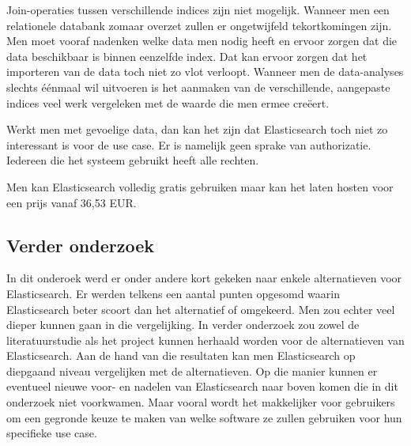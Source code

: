 Join-operaties tussen verschillende indices zijn niet mogelijk. Wanneer men een relationele databank zomaar overzet zullen er ongetwijfeld tekortkomingen zijn. Men moet vooraf nadenken welke data men nodig heeft en ervoor zorgen dat die data beschikbaar is binnen eenzelfde index. Dat kan ervoor zorgen dat het importeren van de data toch niet zo vlot verloopt. Wanneer men de data-analyses slechts éénmaal wil uitvoeren is het aanmaken van de verschillende, aangepaste indices veel werk vergeleken met de waarde die men ermee creëert.

Werkt men met gevoelige data, dan kan het zijn dat Elasticsearch toch niet zo interessant is voor de use case. Er is namelijk geen sprake van authorizatie. Iedereen die het systeem gebruikt heeft alle rechten.

Men kan Elasticsearch volledig gratis gebruiken maar kan het laten hosten voor een prijs vanaf 36,53 EUR.

\subsection{Verder onderzoek}
In dit onderoek werd er onder andere kort gekeken naar enkele alternatieven voor Elasticsearch. Er werden telkens een aantal punten opgesomd waarin Elasticsearch beter scoort dan het alternatief of omgekeerd. Men zou echter veel dieper kunnen gaan in die vergelijking. In verder onderzoek zou zowel de literatuurstudie als het project kunnen herhaald worden voor de alternatieven van Elasticsearch. Aan de hand van die resultaten kan men Elasticsearch op diepgaand niveau vergelijken met de alternatieven. Op die manier kunnen er eventueel nieuwe voor- en nadelen van Elasticsearch naar boven komen die in dit onderzoek niet voorkwamen. Maar vooral wordt het makkelijker voor gebruikers om een gegronde keuze te maken van welke software ze zullen gebruiken voor hun specifieke use case.